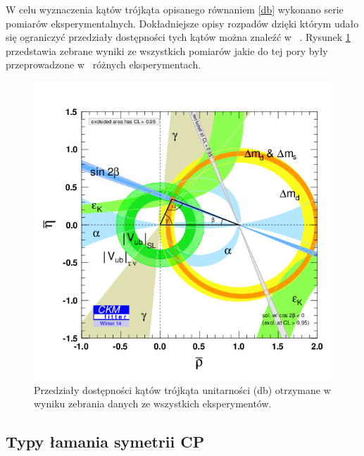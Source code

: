 W celu wyznaczenia kątów trójkąta opisanego równaniem \ref{db} wykonano serie pomiarów eksperymentalnych. Dokładniejsze opisy rozpadów dzięki którym udało się ograniczyć przedziały dostępności tych kątów można znaleźć w~ \cite{PDG}. Rysunek \ref{fig:trojkat wyniki} przedstawia zebrane wyniki ze wszystkich pomiarów jakie do tej pory były przeprowadzone w~  różnych eksperymentach. 
 


 \begin{figure}[ht]
 \centering
 \includegraphics[scale=0.7]{rozdzial1/triangle.png}
 \caption{Przedziały dostępności kątów trójkąta unitarności (db) otrzymane w wyniku zebrania danych ze wszystkich eksperymentów.\cite{triangle} }
 \label{fig:trojkat wyniki}
\end{figure}


\subsection{Typy łamania symetrii \textbf{CP}}

